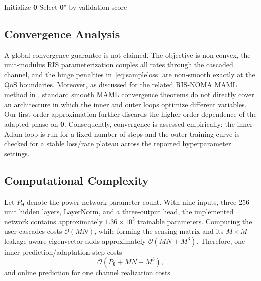 \begin{algorithm}[t]
\SetAlgoLined
\DontPrintSemicolon
{}
Initialize $\bm\theta$\;
\While{not converged}{
 Sample a mini-batch of $B$ channels\;
 \ForEach{channel $b$}{
   Initialize $\bm\phi_b^{(0)}\sim\mathcal U([0,2\pi)^N)$\;
   \For{$j=0$ \KwTo $K-1$}{
     Compute phase-dependent channels/gains and $\bm z_b^{(j)}$\;
     Predict $\bm a_b^{(j)}$ using~\eqref{eq:powerpred}\;
     Evaluate $R_n,R_f,R_s$ and~\eqref{eq:sampleloss}\;
     Update $\bm\phi_b^{(j+1)}$ with inner Adam\;
   }
   Recompute $\bm a_b^{(K)}$ and final loss at the adapted phase\;
 }
 Update $\bm\theta$ with Adam using the first-order gradient in~\eqref{eq:outer}\;
}
Select $\bm\theta^\star$ by validation score\;
\caption{First-order MAML-based power and RIS-phase optimization}
\label{alg:maml}
\end{algorithm}

\subsection{Convergence Analysis}
A global convergence guarantee is not claimed. The objective is non-convex, the
unit-modulus RIS parameterization couples all rates through the cascaded channel,
and the hinge penalties in~\eqref{eq:sampleloss} are non-smooth exactly at the
QoS boundaries. Moreover, as discussed for the related RIS-NOMA MAML method in
\cite{zou2023ml}, standard smooth MAML convergence theorems do not directly
cover an architecture in which the inner and outer loops optimize different
variables. Our first-order approximation further discards the higher-order
dependence of the adapted phase on $\bm\theta$. Consequently, convergence is
assessed empirically: the inner Adam loop is run for a fixed number of steps and
the outer training curve is checked for a stable loss/rate plateau across the
reported hyperparameter settings.

\subsection{Computational Complexity}
Let $P_{\bm\theta}$ denote the power-network parameter count. With nine inputs,
three 256-unit hidden layers, LayerNorm, and a three-output head, the implemented
network contains approximately $1.36\times10^5$ trainable parameters. Computing
the user cascades costs $\mathcal O(MN)$, while forming the sensing matrix and
its $M\times M$ leakage-aware eigenvector adds approximately
$\mathcal O(MN+M^3)$. Therefore, one inner prediction/adaptation step costs
\begin{equation}
\mathcal O\!\left(P_{\bm\theta}+MN+M^3\right),
\end{equation}
and online prediction for one channel realization costs
